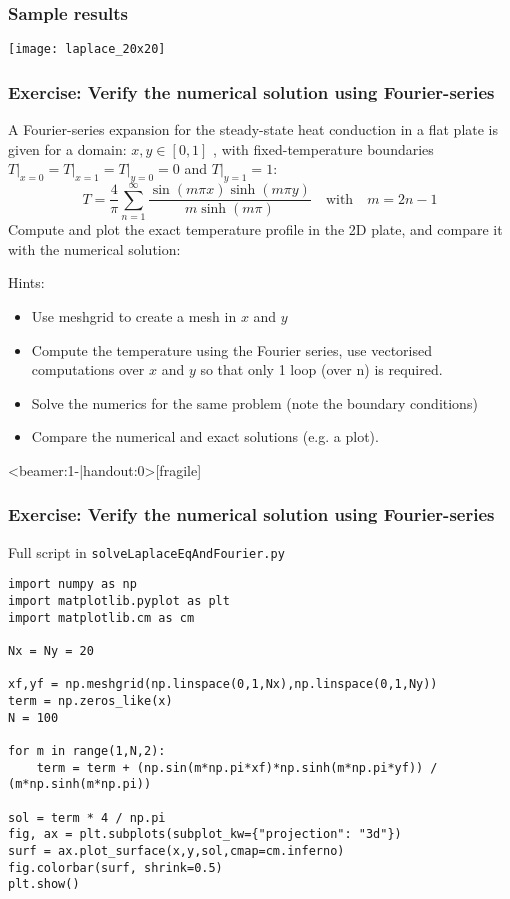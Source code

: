   
\begin{frame}[fragile]
  \frametitle{Sample results}
  \begin{center}
    \texttt{[image: laplace\_20x20]}
  \end{center}
\end{frame}

{\nologo
\begin{frame}[fragile]
  \frametitle{Exercise: Verify the numerical solution using Fourier-series}
  A Fourier-series expansion for the steady-state heat conduction in a flat plate is given for a domain: $x,y\in[0,1]$ , with fixed-temperature boundaries $T\big|_{x=0} = T\big|_{x=1} = T\big|_{y=0}=0$ and $T\big|_{y=1}=1$:
\[
    T = \frac{4}{\pi} \sum_{n=1}^\infty \frac{\sin\left(m \pi x \right)\sinh\left(m\pi y \right)}{m \sinh\left(m \pi \right)} \quad \text{with} \quad m=2n-1
\]
Compute and plot the exact temperature profile in the 2D plate, and compare it with the numerical solution:
  \begin{hints}
  Hints:
  \begin{itemize}
      \item Use meshgrid to create a mesh in $x$ and $y$
      \item Compute the temperature using the Fourier series, use vectorised computations over $x$ and $y$ so that only 1 loop (over n) is required.
      \item Solve the numerics for the same problem (note the boundary conditions)
      \item Compare the numerical and exact solutions (e.g. a plot).
  \end{itemize}
  \end{hints}
\end{frame}

\begin{frame}<beamer:1-|handout:0>[fragile]
  \frametitle{Exercise: Verify the numerical solution using Fourier-series}
  Full script in \lstinline{solveLaplaceEqAndFourier.py}
    \begin{lstlisting}
import numpy as np
import matplotlib.pyplot as plt
import matplotlib.cm as cm

Nx = Ny = 20

xf,yf = np.meshgrid(np.linspace(0,1,Nx),np.linspace(0,1,Ny))
term = np.zeros_like(x)
N = 100

for m in range(1,N,2):
    term = term + (np.sin(m*np.pi*xf)*np.sinh(m*np.pi*yf)) / (m*np.sinh(m*np.pi))

sol = term * 4 / np.pi
fig, ax = plt.subplots(subplot_kw={"projection": "3d"})
surf = ax.plot_surface(x,y,sol,cmap=cm.inferno)
fig.colorbar(surf, shrink=0.5)
plt.show()
    \end{lstlisting}
\end{frame}
}

